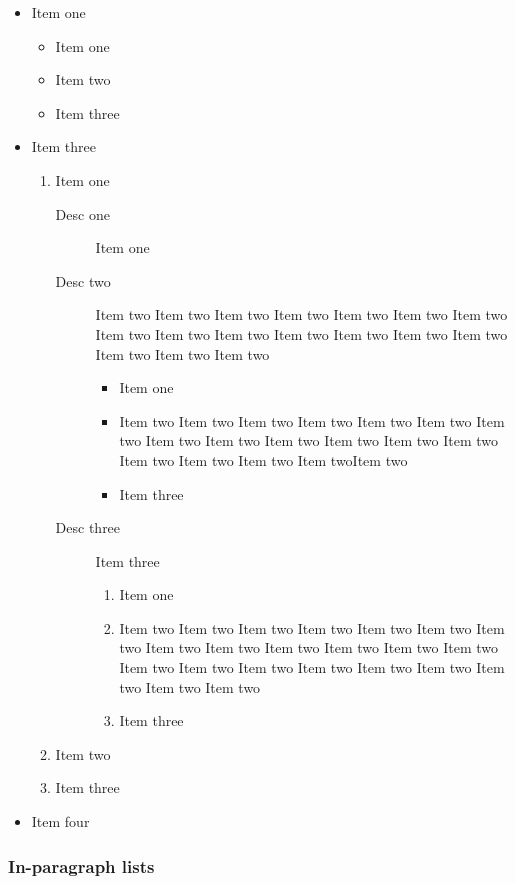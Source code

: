\begin{itemize}
  \item Item one
  \begin{itemize}
    \item Item one
    \item Item two
    \item Item three
  \end{itemize}
  \item Item three
  \begin{enumerate}
    \item Item one
    \begin{description}
      \item[Desc one] Item one
      \item[Desc two] Item two Item two Item two Item two Item two
Item two Item two Item two Item two Item two Item two Item two Item
two Item two Item two Item two Item two
      \begin{itemize}
        \item Item one
        \item Item two Item two Item two Item two Item two Item
        two Item two Item two Item two Item two Item two Item two
        Item two Item
        two Item two Item two Item twoItem two
        \item Item three
      \end{itemize}
      \item[Desc three] Item three
      \begin{enumerate}
        \item Item one
        \item Item two Item two Item two Item two Item two Item two
        Item two Item two Item two Item two Item two Item two
        Item two Item
        two Item two Item two Item two Item two Item two Item two Item two Item
        two
        \item Item three
      \end{enumerate}
    \end{description}
    \item Item two
    \item Item three
  \end{enumerate}
  \item Item four
\end{itemize}


\subsubsection{In-paragraph lists}

